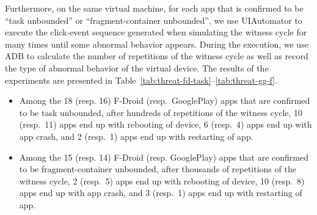  
Furthermore, on the same virtual machine, for each app that is confirmed to be ``task unbounded'' or ``fragment-container unbounded'', we use UIAutomator to execute the click-event sequence generated when simulating the witness cycle for many times until some abnormal behavior appears. 
During the execution, we use ADB to calculate the number of repetitions of the witness cycle as well as record the type of abnormal behavior of the virtual device. The results of the experiments are presented in Table~\ref{tab:threat-fd-task}--\ref{tab:threat-gg-f}. 
%
\begin{itemize}
	\item Among the 18 (resp. 16) F-Droid (resp.\ GooglePlay) apps that are confirmed to be task unbounded, after hundreds of repetitions of the witness cycle, 10 (resp.\ 11) apps end up with rebooting of device, 6 (resp.\ 4) apps end up with app crash, and 2 (resp.\ 1) apps end up with restarting of app.
	\item Among the 15 (resp. 14) F-Droid (resp. GooglePlay) apps that are confirmed to be fragment-container unbounded, after thousands of repetitions of the witness cycle, 2 (resp.\ 5) apps end up with rebooting of device, 10 (resp.\ 8) apps end up with app crash, and 3 (resp.\ 1) apps end up with restarting of app.
\end{itemize}


